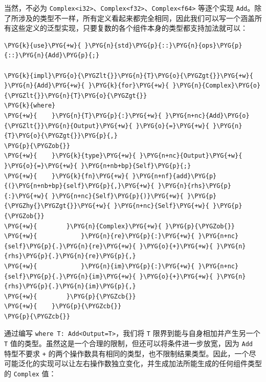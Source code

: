 当然，不必为 \texttt{Complex<i32>}、\texttt{Complex<f32>}、\texttt{Complex<f64>} 等逐个实现 \texttt{Add}。除了所涉及的类型不一样，所有定义看起来都完全相同，因此我们可以写一个涵盖所有这些定义的泛型实现，只要复数的各个组件本身的类型都支持加法就可以：

\begin{Verbatim}[commandchars=\\\{\},breaklines=true,breakanywhere=true,fontsize=\codefont,xleftmargin=17bp]
\PYG{k}{use}\PYG{+w}{ }\PYG{n}{std}\PYG{p}{::}\PYG{n}{ops}\PYG{p}{::}\PYG{n}{Add}\PYG{p}{;}

\PYG{k}{impl}\PYG{o}{\PYGZlt{}}\PYG{n}{T}\PYG{o}{\PYGZgt{}}\PYG{+w}{ }\PYG{n}{Add}\PYG{+w}{ }\PYG{k}{for}\PYG{+w}{ }\PYG{n}{Complex}\PYG{o}{\PYGZlt{}}\PYG{n}{T}\PYG{o}{\PYGZgt{}}
\PYG{k}{where}
\PYG{+w}{    }\PYG{n}{T}\PYG{p}{:}\PYG{+w}{ }\PYG{n+nc}{Add}\PYG{o}{\PYGZlt{}}\PYG{n}{Output}\PYG{+w}{ }\PYG{o}{=}\PYG{+w}{ }\PYG{n}{T}\PYG{o}{\PYGZgt{}}\PYG{p}{,}
\PYG{p}{\PYGZob{}}
\PYG{+w}{    }\PYG{k}{type}\PYG{+w}{ }\PYG{n+nc}{Output}\PYG{+w}{ }\PYG{o}{=}\PYG{+w}{ }\PYG{n+nb+bp}{Self}\PYG{p}{;}
\PYG{+w}{    }\PYG{k}{fn}\PYG{+w}{ }\PYG{n+nf}{add}\PYG{p}{(}\PYG{n+nb+bp}{self}\PYG{p}{,}\PYG{+w}{ }\PYG{n}{rhs}\PYG{p}{:}\PYG{+w}{ }\PYG{n+nc}{Self}\PYG{p}{)}\PYG{+w}{ }\PYG{p}{\PYGZhy{}\PYGZgt{}}\PYG{+w}{ }\PYG{n+nc}{Self}\PYG{+w}{ }\PYG{p}{\PYGZob{}}
\PYG{+w}{        }\PYG{n}{Complex}\PYG{+w}{ }\PYG{p}{\PYGZob{}}
\PYG{+w}{            }\PYG{n}{re}\PYG{p}{:}\PYG{+w}{ }\PYG{n+nc}{self}\PYG{p}{.}\PYG{n}{re}\PYG{+w}{ }\PYG{o}{+}\PYG{+w}{ }\PYG{n}{rhs}\PYG{p}{.}\PYG{n}{re}\PYG{p}{,}
\PYG{+w}{            }\PYG{n}{im}\PYG{p}{:}\PYG{+w}{ }\PYG{n+nc}{self}\PYG{p}{.}\PYG{n}{im}\PYG{+w}{ }\PYG{o}{+}\PYG{+w}{ }\PYG{n}{rhs}\PYG{p}{.}\PYG{n}{im}\PYG{p}{,}
\PYG{+w}{        }\PYG{p}{\PYGZcb{}}
\PYG{+w}{    }\PYG{p}{\PYGZcb{}}
\PYG{p}{\PYGZcb{}}
\end{Verbatim}

通过编写 \texttt{where T: Add<Output=T>}，我们将 \texttt{T} 限界到能与自身相加并产生另一个 \texttt{T} 值的类型。虽然这是一个合理的限制，但还可以将条件进一步放宽，因为 \texttt{Add} 特型不要求 \texttt{+} 的两个操作数具有相同的类型，也不限制结果类型。因此，一个尽可能泛化的实现可以让左右操作数独立变化，并生成加法所能生成的任何组件类型的 \texttt{Complex} 值：

